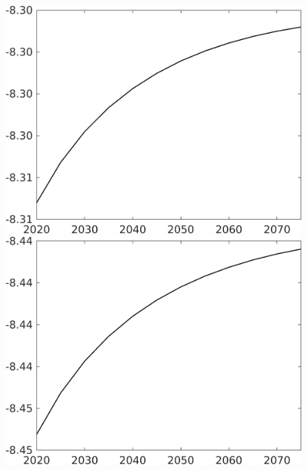 \documentclass[12pt]{article}
\begin{document}
\begin{figure}[h!!]
\begin{minipage}[]{0.32\textwidth}
	\end{minipage}	
	\begin{minipage}[]{0.32\textwidth}
		\includegraphics[width=1\textwidth]{../../codding_model/own_basedOnFried/optimalPol_010922_revision/figures/all_13Sept22/CompTaul_LFBAUPer_Reg0_F_spillover0_nsk0_xgr1_knspil0_sep1_countec0_GovRev0_etaa0.79.png}
	\end{minipage}	
	\begin{minipage}[]{0.32\textwidth}
		\includegraphics[width=1\textwidth]{../../codding_model/own_basedOnFried/optimalPol_010922_revision/figures/all_13Sept22/CompTaul_LFBAUPer_Reg0_G_spillover0_nsk0_xgr1_knspil0_sep1_countec0_GovRev0_etaa0.79.png}

\end{minipage}
\end{figure}
\end{document}
